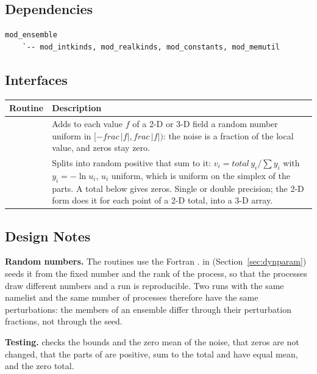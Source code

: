 \subsection{Dependencies}

\begin{lstlisting}
mod_ensemble
    `-- mod_intkinds, mod_realkinds, mod_constants, mod_memutil
\end{lstlisting}

\subsection{Interfaces}

\begin{longtable}{L{5.2cm} L{8.8cm}}
  \toprule
  \textbf{Routine} & \textbf{Description} \\
  \midrule
  \endhead
  \bottomrule
  \endfoot
   &
    Adds to each value $f$ of a 2-D or 3-D  field a random number
    uniform in $[-\mathit{frac}\,|f|, \mathit{frac}\,|f|)$: the noise is
    a fraction of the local value, and zeros stay zero. \\
   &
    Splits  into  random positive  that
    sum to it: $v_i = \mathit{total}\, y_i / \sum y_i$ with $y_i = -\ln
    u_i$, $u_i$ uniform, which is uniform on the simplex of the parts. A
    total below  gives zeros. Single or double precision; the
    2-D form does it for each point of a 2-D total, into a 3-D array. \\
\end{longtable}

\subsection{Design Notes}

\textbf{Random numbers.} The routines use the Fortran .
 in 
(Section~\ref{sec:dynparam}) seeds it from the fixed number
 and the rank of the process, so that the processes
draw different numbers and a run is reproducible. Two runs with the same
namelist and the same number of processes therefore have the same
perturbations: the members of an ensemble differ through their
perturbation fractions, not through the seed.

\textbf{Testing.}  checks the bounds
and the zero mean of the noise, that zeros are not changed, that the parts
of  are positive, sum to the total and have equal mean,
and the zero total.

